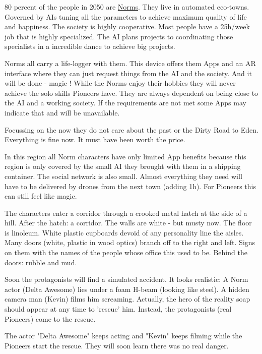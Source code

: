 \begin{sidebarBox}[title=Norms]

80 percent of the people in 2050 are \hyperref[sec:Norms]{Norms}. They live in automated eco-towns. Governed by AIs tuning all the parameters to achieve maximum quality of life and happiness. The society is highly cooperative. Most people have a 25h/week job that is highly specialized. The AI plans projects to coordinating those specialists in a incredible dance to achieve big projects.

Norms all carry a life-logger with them. This device offers them Apps and an AR interface where they can just request things from the AI and the society. And it will be done - magic !
While the Norms enjoy their hobbies they will never achieve the solo skills Pioneers have. They are always dependent on being close to the AI and a working society. If the requirements are not met some Apps may indicate that and will be unavailable.

Focussing on the now they do not care about the past or the Dirty Road to Eden. Everything is fine now. It must have been worth the price.

In this region all Norm characters have only limited App benefits because this region is only covered by the small AI they brought with them in a shipping container. The social network is also small. Almost everything they need will have to be delivered by drones from the next town (adding 1h). For Pioneers this can still feel like magic.

\end{sidebarBox}

The characters enter a corridor through a crooked metal hatch at the side of a hill. After the hatch: a corridor. The walls are white - but musty now. The floor is linoleum.
White plastic cupboards devoid of any personality line the aisles. Many doors (white, plastic in wood optics) branch off to the right and left. Signs on them with the names of the people whose office this used to be. Behind the doors: rubble and mud.

Soon the protagonists will find a simulated accident. It looks realistic: A Norm actor (Delta Awesome) lies under a foam H-beam (looking like steel). A hidden camera man (Kevin) films him screaming. Actually, the hero of the reality soap should appear at any time to 'rescue' him. Instead, the protagonists (real Pioneers) come to the rescue.

The actor "Delta Awesome" keeps acting and "Kevin" keeps filming while the Pioneers start the rescue. They will soon learn there was no real danger.

